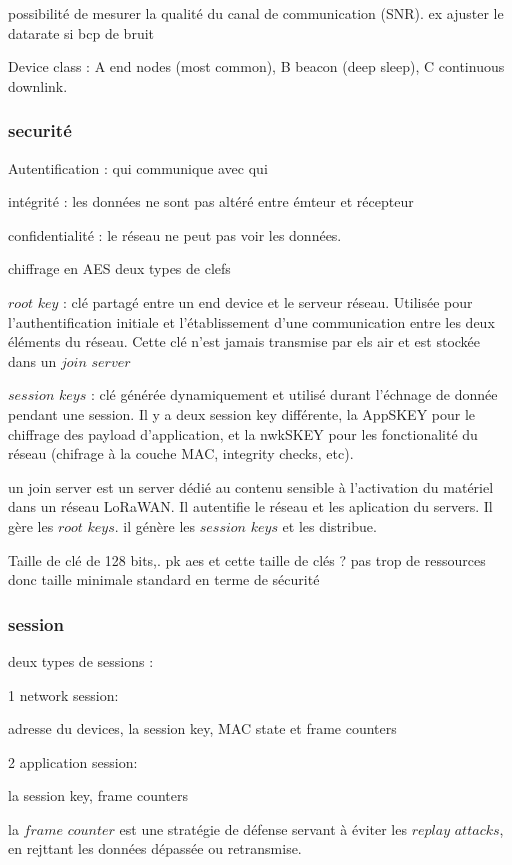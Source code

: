 \documentclass[12pt,a4paper,oneside, titlepage]{report}
\begin{document}
possibilité de mesurer la qualité du canal de communication (SNR). ex ajuster le datarate si bcp de bruit

Device class :
A end nodes (most common), 
B beacon (deep sleep),
C continuous downlink.

\subsubsection{securité}

Autentification : qui communique avec qui

intégrité : les données ne sont pas altéré entre émteur et récepteur

confidentialité : le réseau ne peut pas voir les données.

chiffrage en AES
deux types de clefs

$root$ $key$ : clé partagé entre un end device et le serveur réseau. Utilisée pour l'authentification initiale et l'établissement d'une communication entre les deux éléments du réseau. Cette clé n'est jamais transmise par els air et est stockée dans un $join$ $server$

$session$ $keys$ : clé générée dynamiquement et utilisé durant l'échnage de donnée pendant une session. Il y a deux session key différente, la AppSKEY pour le chiffrage des payload d'application, et la nwkSKEY pour les fonctionalité du réseau (chifrage à la couche MAC, integrity checks, etc).

un join server est un server dédié au contenu sensible à l'activation du matériel dans un réseau LoRaWAN. Il autentifie le réseau et les aplication du servers. Il gère les $root$ $keys$. il génère les $session$ $keys$ et les distribue.

Taille de clé de 128 bits,.
pk aes et cette taille de clés ? pas trop de ressources donc taille minimale standard en terme de sécurité

\subsubsection{session}

deux types de sessions :

1 network session:

adresse du devices, la session key, MAC state et frame counters

2 application session:

la session key, frame counters

la $frame$ $counter$ est une stratégie de défense servant à éviter les $replay$ $attacks$, en rejttant les données dépassée ou retransmise. 
\end{document}
